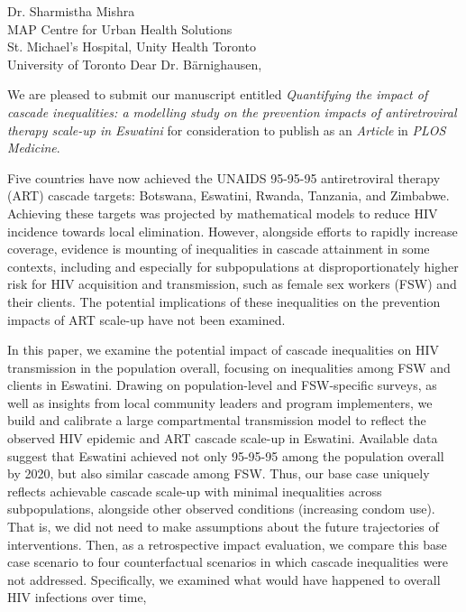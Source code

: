 \address{
  Dr. Till W. B\"{a}rnighausen\\
  Editor-in-Chief\\
  PLOS Medicine
}{Dr. Sharmistha Mishra\\
  MAP Centre for Urban Health Solutions\\
  St. Michael's Hospital, Unity Health Toronto\\
  University of Toronto}
Dear Dr. B\"{a}rnighausen,
\par
We are pleased to submit our manuscript entitled
\emph{Quantifying the impact of cascade inequalities:
  a modelling study on the prevention impacts of antiretroviral therapy scale-up in Eswatini}
for consideration to publish as an \emph{Article} in \emph{PLOS Medicine}.
\par
Five countries have now achieved
the UNAIDS 95-95-95 antiretroviral therapy (ART) cascade targets:
Botswana, Eswatini, Rwanda, Tanzania, and Zimbabwe.
Achieving these targets was projected by
mathematical models to reduce HIV incidence towards local elimination.
However, alongside efforts to rapidly increase coverage,
evidence is mounting of inequalities in cascade attainment in some contexts,
including and especially for subpopulations
at disproportionately higher risk for HIV acquisition and transmission,
such as female sex workers (FSW) and their clients.
The potential implications of these inequalities on
the prevention impacts of ART scale-up have not been examined.
\par
In this paper, we examine the potential impact of
cascade inequalities on HIV transmission in the population overall,
focusing on inequalities among FSW and clients in Eswatini.
Drawing on population-level and FSW-specific surveys,
as well as insights from local community leaders and program implementers,
we build and calibrate a large compartmental transmission model
to reflect the observed HIV epidemic and ART cascade scale-up in Eswatini.
Available data suggest that Eswatini achieved not only
95-95-95 among the population overall by 2020, but also similar cascade among FSW.
Thus, our base case uniquely reflects achievable cascade scale-up
with minimal inequalities across subpopulations,
alongside other observed conditions (\eg increasing condom use).
That is, we did not need to make assumptions about
the future trajectories of interventions.
Then, as a retrospective impact evaluation, we compare
this base case scenario to four counterfactual scenarios in which
cascade inequalities were not addressed.
Specifically, we examined what would have happened to overall HIV infections over time,
